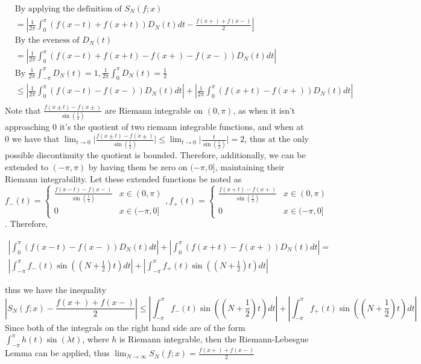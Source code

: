 \documentclass[12pt, letterpaper]{article}
\begin{document}
\begin{enumerate}
\begin{align*}
		&\text{By applying the definition of } S_N(f;x)\\
		&= |\frac{1}{2\pi}\int_{0}^\pi (f(x-t) +f(x+t)) D_N(t) dt- \frac{f(x+) + f(x-)}{2}|\\
		&\text{By the eveness of } D_N(t)\\
		&= |\frac{1}{2\pi}\int_{0}^\pi (f(x-t) + f(x+t) - f(x+) - f(x-)) D_N(t) dt|\\
		&\text{By } \frac{1}{2\pi}\int_{-\pi}^\pi D_N(t) = 1, \frac{1}{2\pi}\int_{0}^\pi D_N(t) = \frac{1}{2}\\
		&\leq |\frac{1}{2\pi}\int_{0}^\pi (f(x-t)-f(x-))D_N(t)dt | + |\frac{1}{2\pi}\int_{0}^\pi (f(x+t) - f(x+))D_N(t)dt| \\
	\end{align*}
	Note that $\frac{f(x\pm t)-f(x\pm)}{\sin(\frac{t}{2})}$
	are Riemann integrable on $(0,\pi)$, as when it isn't 
	approaching 0 it's the quotient of two riemann integrable 
	functions, and when at 0 we have that 
	$\lim_{t \to 0} \lvert \frac{f(x\pm t)-f(x\pm)}{\sin(\frac{t}{2})} \rvert \leq \lim_{t \to 0} \lvert \frac{t}{\sin(\frac{t}{2})} \rvert = 2$, thus at the only possible discontinuity the 
	quotient is bounded.
	 Therefore, additionally, we can be extended 
	to $(-\pi,\pi)$ by having them be zero on $(-\pi,0]$, 
	maintaining their Riemann integrability.  Let these 
	extended functions be noted as $f_-(t) = \begin{cases}
	\frac{f(x- t)-f(x-)}{\sin(\frac{t}{2})} & x \in (0,\pi)\\
	0 & x \in (-\pi,0]
	\end{cases} , f_+(t) = \begin{cases}
	\frac{f(x+ t)-f(x+)}{\sin(\frac{t}{2})} & x \in (0,\pi)\\
	0 & x \in (-\pi,0]
	\end{cases}$.  Therefore,
	
	\begin{align*}
	|\int_{0}^\pi (f(x-t)-f(x-))D_N(t)dt | + |\int_{0}^\pi (f(x+t) - f(x+))D_N(t)dt| =\\ |\int_{-\pi}^\pi f_-(t) \sin((N+\frac{1}{2})t)dt|
	+ |\int_{-\pi}^\pi f_+(t) \sin((N+\frac{1}{2})t)dt|
	\end{align*}
	
	
	
	 thus  we have the inequality 
	$$
	|S_N(f;x) - \frac{f(x+) + f(x-)}{2}| \leq 	
	|\int_{-\pi}^\pi f_-(t) \sin((N+\frac{1}{2})t)dt|
	+ |\int_{-\pi}^\pi f_+(t) \sin((N+\frac{1}{2})t)dt|
	$$
	Since both of the integrals on the right hand side 
	are of the form $\int_{-\pi}^\pi h(t)\sin(\lambda t)$, 
	where $h$ is Riemann integrable, then the Riemann-Lebesgue Lemma
	can be applied, thus $\lim_{N \to \infty}S_N(f;x) = \frac{f(x+) + f(x-)}{2}$
\end{enumerate}
\end{document}
